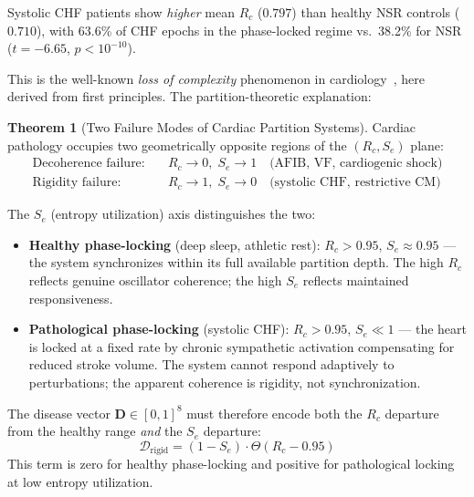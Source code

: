 \documentclass[10pt,twocolumn,a4paper]{article}
\theoremstyle{definition}
\newtheorem{theorem}{Theorem}
\begin{document}
Systolic CHF patients show \emph{higher} mean $R_c$ ($0.797$) than healthy
NSR controls ($0.710$), with 63.6\% of CHF epochs in the phase-locked regime
vs.\ 38.2\% for NSR ($t = -6.65$, $p < 10^{-10}$).

This is the well-known \emph{loss of complexity} phenomenon in cardiology~\cite{goldberger2002fractal,nolan1998prospective,guzzetti2000sympathetic}, here derived from first principles. The
partition-theoretic explanation:

\begin{theorem}[Two Failure Modes of Cardiac Partition Systems]
\label{thm:two_failure_modes}
Cardiac pathology occupies two geometrically opposite regions of the
$(R_c, S_e)$ plane:
\begin{align}
\text{Decoherence failure:} &\quad R_c \to 0,\; S_e \to 1
\quad \text{(AFIB, VF, cardiogenic shock)}\\
\text{Rigidity failure:} &\quad R_c \to 1,\; S_e \to 0
\quad \text{(systolic CHF, restrictive CM)}
\end{align}
\end{theorem}

The $S_e$ (entropy utilization) axis distinguishes the two:
\begin{itemize}
\item \textbf{Healthy phase-locking} (deep sleep, athletic rest):
  $R_c > 0.95$, $S_e \approx 0.95$ --- the system synchronizes within its
  full available partition depth. The high $R_c$ reflects genuine oscillator
  coherence; the high $S_e$ reflects maintained responsiveness.

\item \textbf{Pathological phase-locking} (systolic CHF):
  $R_c > 0.95$, $S_e \ll 1$ --- the heart is locked at a fixed rate by
  chronic sympathetic activation compensating for reduced stroke volume.
  The system cannot respond adaptively to perturbations; the apparent
  coherence is rigidity, not synchronization.
\end{itemize}

The disease vector $\mathbf{D} \in [0,1]^8$ must therefore encode both
the $R_c$ departure from the healthy range \emph{and} the $S_e$ departure:
\begin{equation}
\mathcal{D}_{\text{rigid}} = \left(1 - S_e\right) \cdot \Theta(R_c - 0.95)
\end{equation}
This term is zero for healthy phase-locking and positive for pathological
locking at low entropy utilization.
\end{document}
